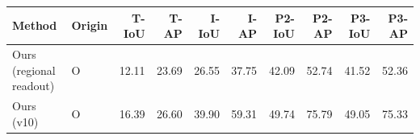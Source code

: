 \begin{tabular}{llrrrrrrrr}
\toprule
Method & Origin & T-IoU & T-AP & I-IoU & I-AP & P2-IoU & P2-AP & P3-IoU & P3-AP \\
\midrule
Ours (regional readout) & O & 12.11 & 23.69 & 26.55 & 37.75 & 42.09 & 52.74 & 41.52 & 52.36 \\
Ours (v10) & O & 16.39 & 26.60 & 39.90 & 59.31 & 49.74 & 75.79 & 49.05 & 75.33 \\
\bottomrule
\end{tabular}
